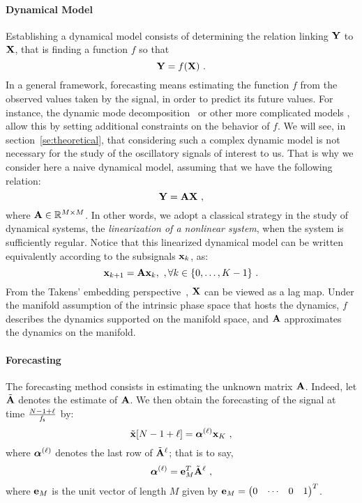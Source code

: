 \paragraph{Dynamical Model} 
Establishing a dynamical model consists of determining the relation linking ${\mathbf Y}$ to ${\mathbf X}$, that is finding a function $f$ so that
\begin{equation}
\bY = f(\bX)\ .
\label{eq:generic.model}
\end{equation}
In a general framework, forecasting means estimating the function $f$ from the observed values taken by the signal, in order to predict its future values. For instance, the dynamic mode decomposition~\cite{Schmid10dynamic,Williams15data} or other more complicated models \cite{Roberts13Gaussian,DeLivera11forecasting,west2006bayesian,vlachas2018data}, allow this by setting additional constraints on the behavior of $f$. We will see, in section~\ref{se:theoretical}, that considering such a complex dynamic model is not necessary for the study of the oscillatory signals of interest to us. That is why we consider here a naive dynamical model, assuming that we have the following relation:
\begin{equation}
\bY = \bA\bX\ ,
\label{eq:dyn.model}
\end{equation}
where ${\mathbf A}\in{\mathbb R}^{M\times M}$. In other words, we adopt a classical strategy in the study of dynamical systems, the {\em linearization of a nonlinear system}, when the system is sufficiently regular. Notice that this linearized dynamical model can be written equivalently according to the subsignals ${\mathbf x}_k$, as:
\begin{equation}
{\mathbf x}_{k+1} = {\mathbf A}{\mathbf x}_{k},\ ,\forall k\in\{0,\dots,K-1\}\ .
\end{equation}
From the Takens' embedding perspective~\cite{Takens81detecting}, ${\mathbf X}$ can be viewed as a lag map. Under the manifold assumption of the intrinsic phase space that hosts the dynamics, $f$ describes the dynamics supported on the manifold space, and ${\mathbf A}$ approximates the dynamics on the manifold. 


\paragraph{Forecasting}
The forecasting method consists in estimating the unknown matrix ${\mathbf A}$. Indeed, let $\tilde{{\mathbf A}}$ denotes the estimate of ${\mathbf A}$. We then obtain the forecasting of the signal at time $\frac{N-1+\ell}{f_{\mathsf s}}$ by:
\begin{equation}
\label{eq:prediction}
\tilde \bx [N-1+\ell] = \balpha^{(\ell)}\bx_{K}\ ,
\end{equation}  
where $\boldsymbol{\alpha}^{(\ell)}$ denotes the last row of $\tilde{{\mathbf A}}^\ell$; that is to say,
\begin{equation}
\balpha^{(\ell)}=\be_M^T\tilde\bA^\ell\ ,
\label{eq:alpha.l}
\end{equation}
where ${\mathbf e}_M$ is the unit vector of length $M$ given by ${\mathbf e}_M = \begin{pmatrix} 0 & \cdots & 0 & 1\end{pmatrix}^T$.

